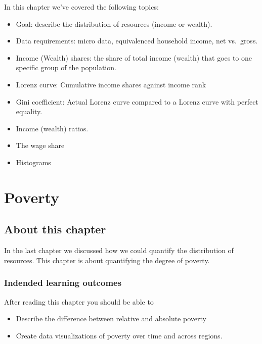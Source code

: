 \documentclass[]{book}
\providecommand{\tightlist}{%
  \setlength{\itemsep}{0pt}\setlength{\parskip}{0pt}}
\begin{document}
In this chapter we've covered the following topics:

\begin{itemize}
\tightlist
\item
  Goal: describe the distribution of resources (income or wealth).
\item
  Data requirements: micro data, equivalenced household income, net vs.~gross.
\item
  Income (Wealth) shares: the share of total income (wealth) that goes to one specific group of the population.
\item
  Lorenz curve: Cumulative income shares against income rank
\item
  Gini coefficient: Actual Lorenz curve compared to a Lorenz curve with perfect equality.
\item
  Income (wealth) ratios.
\item
  The wage share
\item
  Histograms
\end{itemize}

\hypertarget{poverty}{%
\chapter{Poverty}\label{poverty}}

\hypertarget{about-this-chapter-7}{%
\section{About this chapter}\label{about-this-chapter-7}}

In the last chapter we discussed how we could quantify the distribution of resources. This chapter is about quantifying the degree of poverty.

\hypertarget{indended-learning-outcomes}{%
\subsection{Indended learning outcomes}\label{indended-learning-outcomes}}

After reading this chapter you should be able to

\begin{itemize}
\tightlist
\item
  Describe the difference between relative and absolute poverty
\item
  Create data visualizations of poverty over time and across regions.
\end{itemize}
\end{document}

